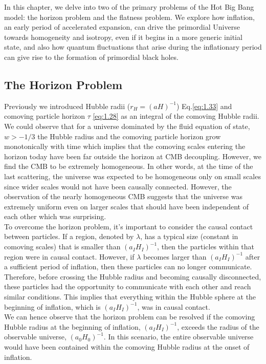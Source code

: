 In this chapter, we delve into two of the primary problems of the Hot Big Bang model: the horizon problem and the flatness problem. We explore how inflation, an early period of accelerated expansion, can drive the primordial Universe towards homogeneity and isotropy, even if it begins in a more generic initial state, and also how quantum fluctuations that arise during the inflationary period can give rise to the formation of primordial black holes.

\subsection{The Horizon Problem}
\hspace{0.5cm}Previously we introduced Hubble radii ($r_H = (aH)^{-1}$) Eq.\ref{eq:1.33} and comoving particle horizon $\tau$ \ref{eq:1.28} as an integral of the comoving Hubble radii. We could observe that for a universe dominated by the fluid equation of state, $w > -1/3 $ the Hubble radius and the comoving particle horizon grow monotonically with time which implies that the comoving scales entering the horizon today have been far outside the horizon at CMB decoupling. However, we find the CMB to be extremely homogeneous. In other words, at the time of the last scattering, the universe was expected to be homogeneous only on small scales since wider scales would not have been causally connected. However, the observation of the nearly homogeneous CMB suggests that the universe was extremely uniform even on larger scales that should have been independent of each other which was surprising.\\
\hspace{0.5cm}To overcome the horizon problem, it's important to consider the causal contact between particles. If a region, denoted by $\lambda$, has a typical size (constant in comoving scales) that is smaller than $(a_{I}H_{I})^{-1}$, then the particles within that region were in causal contact. However, if $\lambda$ becomes larger than $(a_{I}H_{I})^{-1}$ after a sufficient period of inflation, then these particles can no longer communicate. Therefore, before crossing the Hubble radius and becoming causally disconnected, these particles had the opportunity to communicate with each other and reach similar conditions. This implies that everything within the Hubble sphere at the beginning of inflation, which is $(a_{I}H_{I})^{-1}$, was in causal contact.\\
\hspace{0.5cm} We can hence observe that the horizon problem can be resolved if the comoving Hubble radius at the beginning of inflation, $(a_I H_I)^{-1}$, exceeds the radius of the observable universe, $(a_0 H_0)^{-1}$. In this scenario, the entire observable universe would have been contained within the comoving Hubble radius at the onset of inflation.\\
